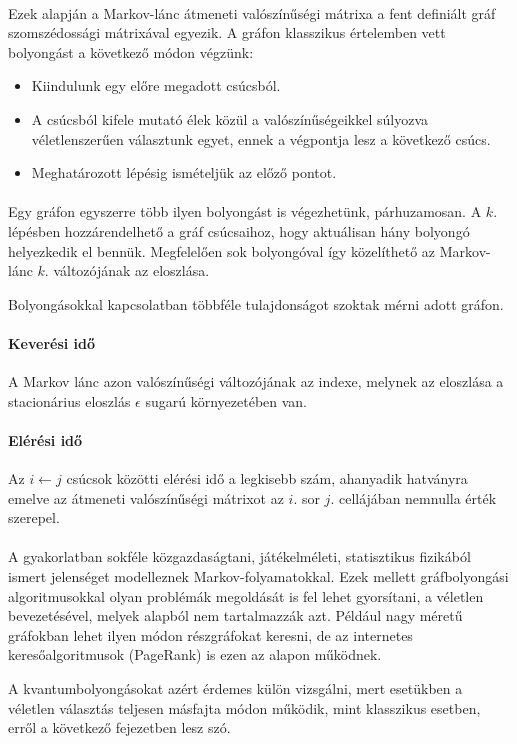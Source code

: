 \paragraph{}

Ezek alapján a Markov-lánc átmeneti valószínűségi mátrixa a fent definiált gráf
szomszédossági mátrixával egyezik. A gráfon klasszikus értelemben vett
bolyongást a következő módon végzünk:

\begin{itemize}
  \item Kiindulunk egy előre megadott csúcsból.
  \item A csúcsból kifele mutató élek közül a valószínűségeikkel súlyozva
        véletlenszerűen választunk egyet, ennek a végpontja lesz a következő csúcs.
  \item Meghatározott lépésig ismételjük az előző pontot.
\end{itemize}

\paragraph{}

Egy gráfon egyszerre több ilyen bolyongást is végezhetünk, párhuzamosan. A $k.$
lépésben hozzárendelhető a gráf csúcsaihoz, hogy aktuálisan hány bolyongó
helyezkedik el bennük. Megfelelően sok bolyongóval így közelíthető az
Markov-lánc $k.$ változójának az eloszlása.

Bolyongásokkal kapcsolatban többféle tulajdonságot szoktak mérni adott gráfon.

\paragraph{Keverési idő} A Markov lánc azon valószínűségi változójának az
indexe, melynek az eloszlása a stacionárius eloszlás $\epsilon$ sugarú
környezetében van.

\paragraph{Elérési idő} Az $i \leftarrow j$ csúcsok közötti elérési idő a
legkisebb szám, ahanyadik hatványra emelve az átmeneti valószínűségi mátrixot
az $i.$ sor $j.$ cellájában nemnulla érték szerepel.

\paragraph{}

A gyakorlatban sokféle közgazdaságtani, játékelméleti, statisztikus fizikából
ismert jelenséget modelleznek Markov-folyamatokkal. Ezek mellett gráfbolyongási
algoritmusokkal olyan problémák megoldását is fel lehet gyorsítani, a véletlen
bevezetésével, melyek alapból nem tartalmazzák azt. Például nagy méretű
gráfokban lehet ilyen módon részgráfokat keresni, de az internetes
keresőalgoritmusok (PageRank) is ezen az alapon működnek.

A kvantumbolyongásokat azért érdemes külön vizsgálni, mert esetükben a véletlen
választás teljesen másfajta módon működik, mint klasszikus esetben, erről a
következő fejezetben lesz szó.

